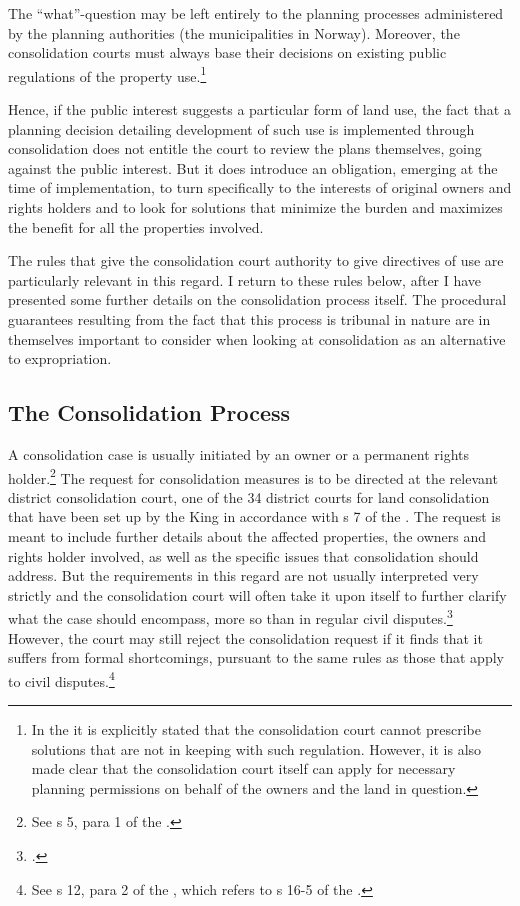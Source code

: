 The ``what''-question may be left entirely to the planning processes administered by the planning authorities (the municipalities in Norway). Moreover, the consolidation courts must always base their decisions on existing public regulations of the property use.\footnote{In the \cite[3-17]{lca13} it is explicitly stated that the consolidation court cannot prescribe solutions that are not in keeping with such regulation. However, it is also made clear that the consolidation court itself can apply for necessary planning permissions on behalf of the owners and the land in question.}

Hence, if the public interest suggests a particular form of land use, the fact that a planning decision detailing development of such use is implemented through consolidation does not entitle the court to review the plans themselves, going against the public interest. But it does introduce an obligation, emerging at the time of implementation, to turn specifically to the interests of original owners and rights holders and to look for solutions that minimize the burden and maximizes the benefit for all the properties involved.

The rules that give the consolidation court authority to give directives of use are particularly relevant in this regard. I return to these rules below, after I have presented some further details on the consolidation process itself. The procedural guarantees resulting from the fact that this process is tribunal in nature are in themselves important to consider when looking at consolidation as an alternative to expropriation.

\subsection{The Consolidation Process}\label{subsec:lcp}

A consolidation case is usually initiated by an owner or a permanent rights holder.\footnote{See s 5, para 1 of the \cite{lca79}.} The request for consolidation measures is to be directed at the relevant district consolidation court, one of the 34 district courts for land consolidation that have been set up by the King in accordance with s 7 of the \cite{lca79}. The request is meant to include further details about the affected properties, the owners and rights holder involved, as well as the specific issues that consolidation should address. But the requirements in this regard are not usually interpreted very strictly and the consolidation court will often take it upon itself to further clarify what the case should encompass, more so than in regular civil disputes.\footcite[39]{langbach09} However, the court may still reject the consolidation request if it finds that it suffers from formal shortcomings, pursuant to the same rules as those that apply to civil disputes.\footnote{See s 12, para 2 of the \cite{lca79}, which refers to s 16-5 of the \cite{cda05}.}

